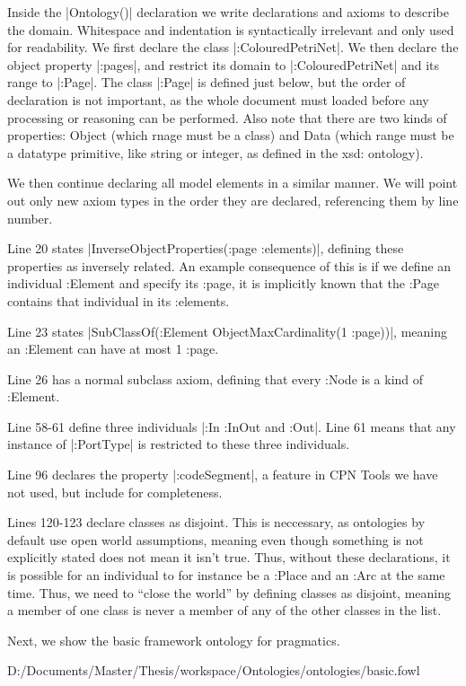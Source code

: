Inside the |Ontology()| declaration we write declarations and axioms to describe
the domain. Whitespace and indentation is syntactically irrelevant and only used
for readability. We first declare the class |:ColouredPetriNet|. We then declare
the object property |:pages|, and restrict its domain to |:ColouredPetriNet| and
its range to |:Page|. The class |:Page| is defined just below, but the order of
declaration is not important, as the whole document must loaded before any
processing or reasoning can be performed. Also note that there are two kinds of
properties: Object (which rnage must be a class) and Data (which range must be
a datatype primitive, like string or integer, as defined in the xsd: ontology).

We then continue declaring all model elements in a similar manner. We will
point out only new axiom types in the order they are declared, referencing them
by line number. 

Line 20 states |InverseObjectProperties(:page :elements)|, defining these
properties as inversely related. An example consequence of this is if we define
an individual :Element and specify its :page, it is implicitly known that the
:Page contains that individual in its :elements.

Line 23 states |SubClassOf(:Element ObjectMaxCardinality(1 :page))|, meaning an
:Element can have at most 1 :page.

Line 26 has a normal subclass axiom, defining that every :Node is a kind of
:Element.

Line 58-61 define three individuals |:In :InOut and :Out|. Line 61 means that
any instance of |:PortType| is restricted to these three individuals.

Line 96 declares the property |:codeSegment|, a feature in CPN Tools we have not
used, but include for completeness.

Lines 120-123 declare classes as disjoint. This is neccessary, as ontologies by
default use open world assumptions, meaning even though something is not
explicitly stated does not mean it isn't true. Thus, without these declarations,
it is possible for an individual to for instance be a :Place and an :Arc at the
same time. Thus, we need to ``close the world'' by defining classes as disjoint,
meaning a member of one class is never a member of any of the other classes in
the list.

Next, we show the basic framework ontology for pragmatics.


{D:/Documents/Master/Thesis/workspace/Ontologies/ontologies/basic.fowl}

